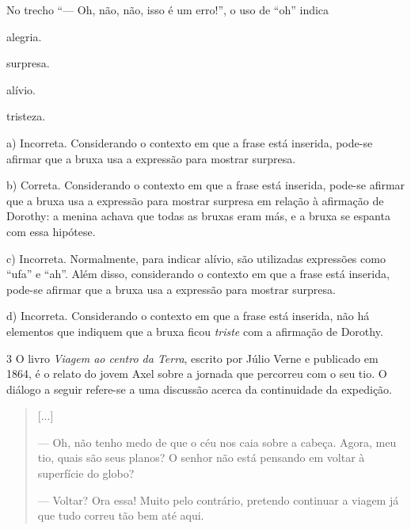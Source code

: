 \begin{escolha}
\begin{escolha}
\begin{escolha}
No trecho ``--- Oh, não, não, isso é um erro!'', o uso de ``oh'' indica

\begin{escolha}
\item alegria.

\item surpresa.

\item alívio.

\item tristeza.
\end{escolha}


a) Incorreta. Considerando o contexto em que a frase está inserida, 
pode-se afirmar que a bruxa usa a expressão para mostrar surpresa.

b) Correta. Considerando o contexto em que a frase está inserida, 
pode-se afirmar que a bruxa usa a expressão para mostrar surpresa em 
relação à afirmação de Dorothy: a menina achava que todas as bruxas eram
más, e a bruxa se espanta com essa hipótese.

c)  Incorreta. Normalmente, para indicar alívio, são utilizadas
expressões como ``ufa'' e ``ah''. Além disso, considerando o contexto em
que a frase está inserida, pode-se afirmar que a bruxa usa a expressão 
para mostrar surpresa.

d)  Incorreta. Considerando o contexto em que a frase está inserida, 
não há elementos que indiquem que a bruxa ficou \textit{triste} com a 
afirmação de Dorothy.  

\num{3} O livro \textit{Viagem ao centro da Terra}, escrito por Júlio Verne e
publicado em 1864, é o relato do jovem Axel sobre a jornada que
percorreu com o seu tio. O diálogo a seguir refere-se a uma discussão
acerca da continuidade da expedição.

\begin{quote}
{[}...{]}

--- Oh, não tenho medo de que o céu nos caia sobre a cabeça. Agora, meu
tio, quais são seus planos? O senhor não está pensando em voltar à
superfície do globo?

--- Voltar? Ora essa! Muito pelo contrário, pretendo continuar a viagem
já que tudo correu tão bem até aqui.


\end{quote}
\end{escolha}
\end{escolha}
\end{escolha}
